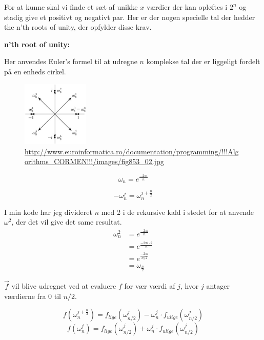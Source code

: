 \documentclass[11pt,a4paper]{article}
\begin{document}
For at kunne skal vi finde et sæt af unikke \(x\) værdier der kan opløftes i \(2^n\) og stadig give et positivt og negativt par.
Her er der nogen specielle tal der hedder the n'th roots of unity, der opfylder disse krav.

\bigskip

\textbf{n'th root of unity:}

Her anvendes Euler's formel til at udregne \(n\) komplekse tal der er liggeligt fordelt på en enheds cirkel.

\begin{figure}[htbp]
\centering
\includegraphics[width=120]{./nth_root_of_unity.jpg}
\caption{\url{http://www.euroinformatica.ro/documentation/programming/!!!Algorithms\_CORMEN!!!/images/fig853\_02.jpg}}
\end{figure}

$$
\omega_n = e^{\frac{-2\pi i}{n}}
$$

$$
-\omega_n^j = \omega_n^{j+\frac{n}{2}}
$$

I min kode har jeg divideret \(n\) med 2 i de rekursive kald i stedet for at anvende \(\omega^2\), der det vil give det same resultat.
\begin{equation}
\begin{split}
\omega_n^2 &= e^{\frac{-2\pi i}{n}} \\
&= e^{\frac{-2\pi i \cdot 2}{n}} \\
&= e^{\frac{-2\pi i}{n/2}} \\
&= \omega_{\frac{n}{2}}
\end{split}
\end{equation}

\(\vec{f}\) vil blive udregnet ved at evaluere \(f\) for vær værdi af \(j\), hvor \(j\) antager værdierne fra 0 til \(n/2\).

$$
f(\omega^{j+\frac{n}{2}}_n) = f_{lige}(\omega^j_{n/2}) - \omega^j_n \cdot f_{ulige}(\omega^j_{n/2})
$$
$$
f(\omega^j_n) = f_{lige}(\omega^j_{n/2}) + \omega^j_n \cdot f_{ulige}(\omega^j_{n/2})
$$
\end{document}
